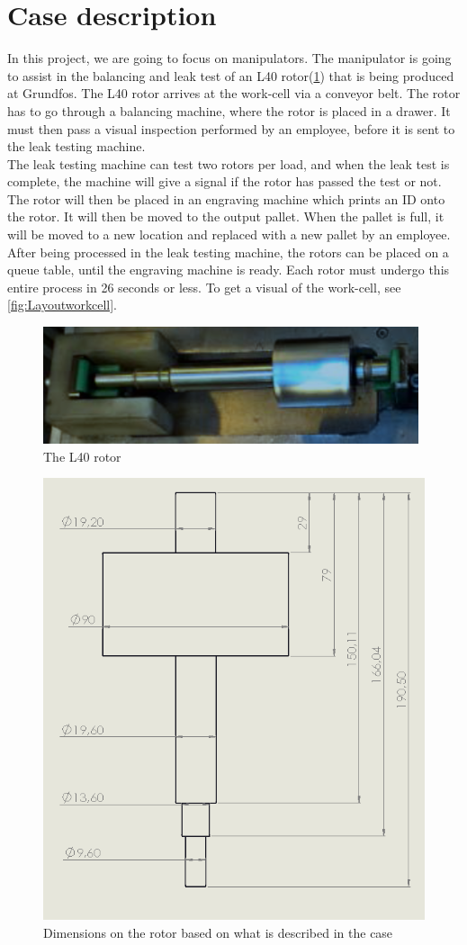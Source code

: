\section{Case description} \label{ch:case description}

In this project, we are going to focus on manipulators.
The manipulator is going to assist in the balancing and leak test of an L40 rotor(\ref{fig:rotor}) that is being produced at Grundfos. The L40 rotor arrives at the work-cell via a conveyor belt. The rotor has to go through a balancing machine, where the rotor is placed in a drawer. It must then pass a visual inspection performed by an employee, before it is sent to the leak testing machine.\\
The leak testing machine can test two rotors per load, and when the leak test is complete, the machine will give a signal if the rotor has passed the test or not. The rotor will then be placed in an engraving machine which prints an ID onto the rotor. It will then be moved to the output pallet. When the pallet is full, it will be moved to a new location and replaced with a new pallet by an employee.\\ 
After being processed in the leak testing machine, the rotors can be placed on a queue table, until the engraving machine is ready. Each rotor must undergo this entire process in 26 seconds or less. To get a visual of the work-cell, see \ref{fig:Layoutworkcell}.\\

\begin{figure}[H]
    \centering
    \includegraphics[width=.48\textwidth]{InitialProblemstatement/Case/rotorlille.PNG}
    \caption{The L40 rotor}
    \label{fig:rotor}
\end{figure}

\begin{figure}[H]
    \centering
    \includegraphics[width=.70\textwidth]{InitialProblemstatement/Case/rotordims.PNG}
    \caption{Dimensions on the rotor based on what is described in the case\cite{Case}}
    \label{fig:rotor_dims}
\end{figure}


\newpage

